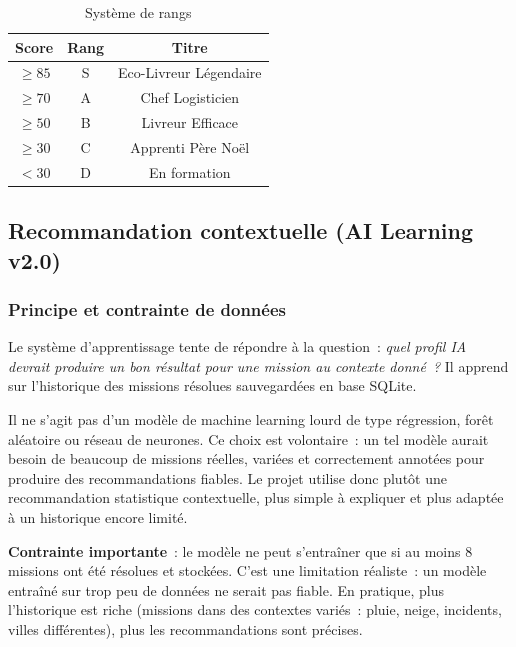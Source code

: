 \documentclass[a4paper, 12pt, twoside]{article}
\begin{document}
\begin{table}[h]
  \begin{center}
    \begin{tabular}{|c|c|c|}
      \hline
      \textbf{Score} & \textbf{Rang} & \textbf{Titre} \\
      \hline
      $\geq 85$ & S & Eco-Livreur L\'{e}gendaire \\
      $\geq 70$ & A & Chef Logisticien \\
      $\geq 50$ & B & Livreur Efficace \\
      $\geq 30$ & C & Apprenti P\`{e}re No\"{e}l \\
      $< 30$ & D & En formation \\
      \hline
    \end{tabular}
  \end{center}
  \caption{Syst\`{e}me de rangs}
  \label{tab:ranks}
\end{table}

\subsection{Recommandation contextuelle (AI Learning v2.0)}

\subsubsection{Principe et contrainte de donn\'{e}es}

Le syst\`{e}me d'apprentissage tente de r\'{e}pondre \`{a} la question~: \emph{quel profil IA
devrait produire un bon r\'{e}sultat pour une mission au contexte donn\'{e}~?} Il apprend sur
l'historique des missions r\'{e}solues sauvegard\'{e}es en base SQLite.

Il ne s'agit pas d'un mod\`{e}le de machine learning lourd de type r\'{e}gression,
for\^{e}t al\'{e}atoire ou r\'{e}seau de neurones. Ce choix est volontaire~: un tel mod\`{e}le
aurait besoin de beaucoup de missions r\'{e}elles, vari\'{e}es et correctement annot\'{e}es
pour produire des recommandations fiables. Le projet utilise donc plut\^{o}t une
recommandation statistique contextuelle, plus simple \`{a} expliquer et plus adapt\'{e}e
\`{a} un historique encore limit\'{e}.

\textbf{Contrainte importante}~: le mod\`{e}le ne peut s'entra\^{i}ner que si au moins
8 missions ont \'{e}t\'{e} r\'{e}solues et stock\'{e}es. C'est une limitation r\'{e}aliste~:
un mod\`{e}le entra\^{i}n\'{e} sur trop peu de donn\'{e}es ne serait pas fiable. En pratique,
plus l'historique est riche (missions dans des contextes vari\'{e}s~: pluie, neige, incidents,
villes diff\'{e}rentes), plus les recommandations sont pr\'{e}cises.
\end{document}
